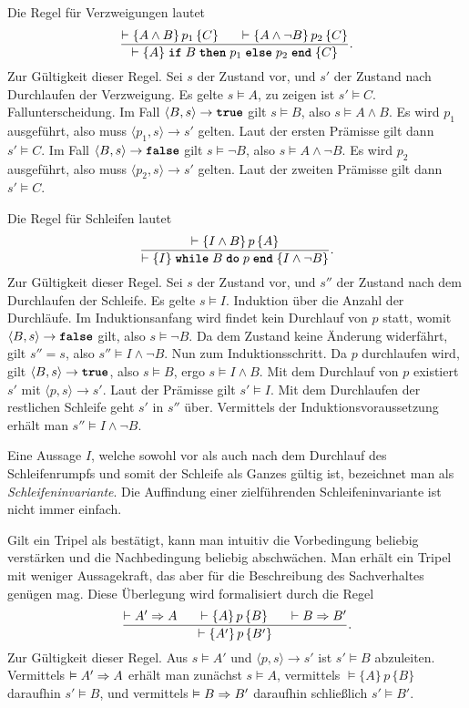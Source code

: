 Die Regel für Verzweigungen lautet
\[\dfrac{\vdash\{A\land B\}\,p_1\,\{C\}\quad\;\;\vdash\{A\land\lnot B\}\,p_2\,\{C\}}
{\vdash\{A\}\;\kw{if}\;B\;\kw{then}\;p_1\;\kw{else}\;p_2\;\kw{end}\;\{C\}}.\]
Zur Gültigkeit dieser Regel. Sei $s$ der Zustand vor, und $s'$ der
Zustand nach Durchlaufen der Verzweigung. Es gelte $s\models A$, zu
zeigen ist $s'\models C$. Fallunterscheidung. Im Fall
$\langle B,s\rangle\to\kw{true}$
gilt $s\models B$, also $s\models A\land B$. Es wird $p_1$ ausgeführt,
also muss $\langle p_1,s\rangle\to s'$ gelten. Laut der ersten Prämisse
gilt dann $s'\models C$. Im Fall $\langle B,s\rangle\to\kw{false}$
gilt $s\models\lnot B$, also $s\models A\land\lnot B$. Es wird $p_2$
ausgeführt, also muss $\langle p_2,s\rangle\to s'$ gelten. Laut der
zweiten Prämisse gilt dann $s'\models C$.

Die Regel für Schleifen lautet
\[\dfrac{\vdash\{I\land B\}\,p\,\{A\}}
{\vdash\{I\}\;\kw{while}\;B\;\kw{do}\;p\;\kw{end}\;\{I\land\lnot B\}}.\]
Zur Gültigkeit dieser Regel. Sei $s$ der Zustand vor, und $s''$
der Zustand nach dem Durchlaufen der Schleife. Es gelte $s\models I$.
Induktion über die Anzahl der Durchläufe. Im Induktionsanfang wird findet
kein Durchlauf von  $p$ statt, womit $\langle B,s\rangle\to\kw{false}$
gilt, also $s\models\lnot B$. Da dem Zustand keine Änderung widerfährt,
gilt $s''=s$, also $s''\models I\land\lnot B$.
Nun zum Induktionsschritt. Da $p$ durchlaufen wird, gilt
$\langle B,s\rangle\to\kw{true}$, also $s\models B$,
ergo $s\models I\land B$. Mit dem Durchlauf von $p$ existiert
$s'$ mit $\langle p,s\rangle\to s'$. Laut der Prämisse gilt
$s'\models I$. Mit dem Durchlaufen der restlichen Schleife geht $s'$
in $s''$ über. Vermittels der Induktionsvoraussetzung erhält man
$s''\models I\land\lnot B$.

Eine Aussage $I$, welche sowohl vor als auch nach dem Durchlauf des
Schleifenrumpfs und somit der Schleife als Ganzes gültig ist, bezeichnet
man als \emph{Schleifeninvariante}. Die Auffindung einer zielführenden
Schleifeninvariante ist nicht immer einfach.

Gilt ein Tripel als bestätigt, kann man intuitiv die Vorbedingung beliebig
verstärken und die Nachbedingung beliebig abschwächen. Man erhält ein
Tripel mit weniger Aussagekraft, das aber für die Beschreibung des
Sachverhaltes genügen mag. Diese Überlegung wird formalisiert durch
die Regel
\[\dfrac{\vdash A'\Rightarrow A\quad\;\;\vdash\{A\}\,p\,\{B\}\quad\;\;\vdash B\Rightarrow B'}
{\vdash\{A'\}\,p\,\{B'\}}.\]
Zur Gültigkeit dieser Regel. Aus $s\models A'$ und
$\langle p,s\rangle\to s'$ ist $s'\models B$ abzuleiten.
Vermittels $\vDash A'\Rightarrow A$ erhält man zunächst $s\models A$,
vermittels $\models\{A\}\,p\,\{B\}$ daraufhin $s'\models B$,
und vermittels $\vDash B\Rightarrow B'$ daraufhin schließlich $s'\models B'$.

